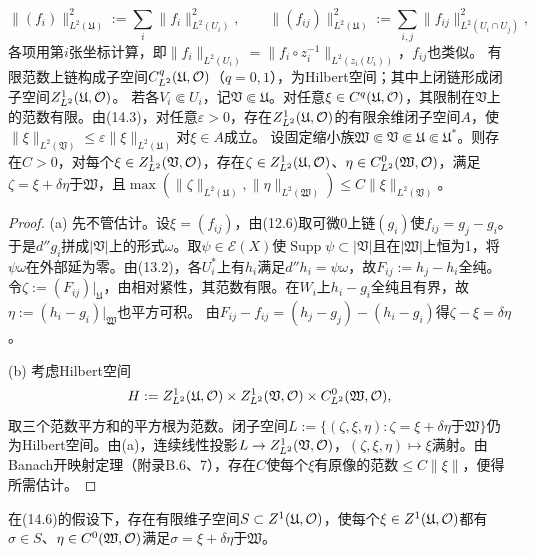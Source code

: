 \[
\|(f_i)\|_{L^2(\mathfrak U)}^2:=\sum_i\|f_i\|_{L^2(U_i)}^2,\qquad
\|(f_{ij})\|_{L^2(\mathfrak U)}^2:=\sum_{i,j}\|f_{ij}\|_{L^2(U_i\cap U_j)}^2,
\]
各项用第$i$张坐标计算，即$\|f_i\|_{L^2(U_i)}=\|f_i\circ z_i^{-1}\|_{L^2(z_i(U_i))}$，$f_{ij}$也类似。
有限范数上链构成子空间$C^q_{L^2}(\mathfrak U,\mathcal O)$（$q=0,1$），为Hilbert空间；其中上闭链形成闭子空间$Z^1_{L^2}(\mathfrak U,\mathcal O)$。
若各$V_i\Subset U_i$，记$\mathfrak V\Subset\mathfrak U$。对任意$\xi\in C^q(\mathfrak U,\mathcal O)$，其限制在$\mathfrak V$上的范数有限。由(14.3)，对任意$\varepsilon>0$，存在$Z^1_{L^2}(\mathfrak U,\mathcal O)$的有限余维闭子空间$A$，使$\|\xi\|_{L^2(\mathfrak V)}\le\varepsilon\|\xi\|_{L^2(\mathfrak U)}$对$\xi\in A$成立。
设固定缩小族$\mathfrak W\Subset\mathfrak V\Subset\mathfrak U\Subset\mathfrak U^*$。则存在$C>0$，对每个$\xi\in Z^1_{L^2}(\mathfrak V,\mathcal O)$，存在$\zeta\in Z^1_{L^2}(\mathfrak U,\mathcal O)$、$\eta\in C^0_{L^2}(\mathfrak W,\mathcal O)$，满足$\zeta=\xi+\delta\eta$于$\mathfrak W$，且$\max(\|\zeta\|_{L^2(\mathfrak U)},\|\eta\|_{L^2(\mathfrak W)})\le C\|\xi\|_{L^2(\mathfrak V)}$。
\begin{proof}
(a) 先不管估计。设$\xi=(f_{ij})$，由(12.6)取可微0上链$(g_i)$使$f_{ij}=g_j-g_i$。于是$d''g_i$拼成$|\mathfrak V|$上的形式$\omega$。取$\psi\in\mathcal E(X)$使$\operatorname{Supp}\psi\subset|\mathfrak V|$且在$|\mathfrak W|$上恒为1，将$\psi\omega$在外部延为零。由(13.2)，各$U_i^*$上有$h_i$满足$d''h_i=\psi\omega$，故$F_{ij}:=h_j-h_i$全纯。令$\zeta:=(F_{ij})|_{\mathfrak U}$，由相对紧性，其范数有限。在$W_i$上$h_i-g_i$全纯且有界，故$\eta:=(h_i-g_i)|_{\mathfrak W}$也平方可积。
由$F_{ij}-f_{ij}=(h_j-g_j)-(h_i-g_i)$得$\zeta-\xi=\delta\eta$。

(b) 考虑Hilbert空间
\[
H:=Z^1_{L^2}(\mathfrak U,\mathcal O)\times Z^1_{L^2}(\mathfrak V,\mathcal O)\times C^0_{L^2}(\mathfrak W,\mathcal O),
\]
取三个范数平方和的平方根为范数。闭子空间$L:=\{(\zeta,\xi,\eta):\zeta=\xi+\delta\eta\text{于}\mathfrak W\}$仍为Hilbert空间。由(a)，连续线性投影$L\to Z^1_{L^2}(\mathfrak V,\mathcal O)$，$(\zeta,\xi,\eta)\mapsto\xi$满射。由Banach开映射定理（附录B.6、7），存在$C$使每个$\xi$有原像的范数$\le C\|\xi\|$，便得所需估计。
\end{proof}
在(14.6)的假设下，存在有限维子空间$S\subset Z^1(\mathfrak U,\mathcal O)$，使每个$\xi\in Z^1(\mathfrak U,\mathcal O)$都有$\sigma\in S$、$\eta\in C^0(\mathfrak W,\mathcal O)$满足$\sigma=\xi+\delta\eta$于$\mathfrak W$。

